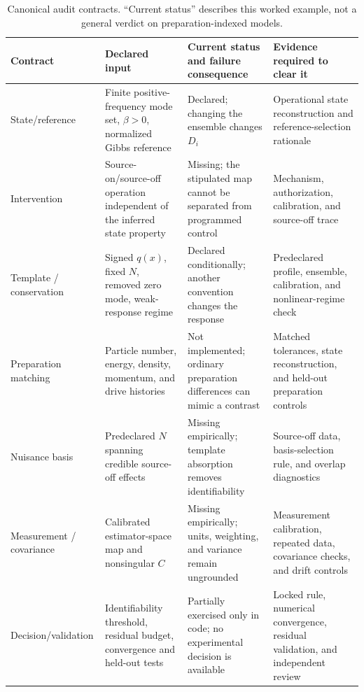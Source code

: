 \documentclass[aps,prd,twocolumn,superscriptaddress,nofootinbib,floatfix]{revtex4-2}
\newcommand{\Drel}{D}
\begin{document}
\begin{table}[t]
\caption{Canonical audit contracts. ``Current status'' describes this worked example, not a general verdict on preparation-indexed models.}
\label{tab:audit-contracts}
\begin{ruledtabular}
\begin{tabular}{p{}p{}p{}p{}}
Contract & Declared input & Current status and failure consequence & Evidence required to clear it \\
\hline
State/reference & Finite positive-frequency mode set, $\beta>0$, normalized Gibbs reference & Declared; changing the ensemble changes $\Drel_i$ & Operational state reconstruction and reference-selection rationale \\
Intervention & Source-on/source-off operation independent of the inferred state property & Missing; the stipulated map cannot be separated from programmed control & Mechanism, authorization, calibration, and source-off trace \\
Template / conservation & Signed $q(x)$, fixed $N$, removed zero mode, weak-response regime & Declared conditionally; another convention changes the response & Predeclared profile, ensemble, calibration, and nonlinear-regime check \\
Preparation matching & Particle number, energy, density, momentum, and drive histories & Not implemented; ordinary preparation differences can mimic a contrast & Matched tolerances, state reconstruction, and held-out preparation controls \\
Nuisance basis & Predeclared $N$ spanning credible source-off effects & Missing empirically; template absorption removes identifiability & Source-off data, basis-selection rule, and overlap diagnostics \\
Measurement / covariance & Calibrated estimator-space map and nonsingular $C$ & Missing empirically; units, weighting, and variance remain ungrounded & Measurement calibration, repeated data, covariance checks, and drift controls \\
Decision/validation & Identifiability threshold, residual budget, convergence and held-out tests & Partially exercised only in code; no experimental decision is available & Locked rule, numerical convergence, residual validation, and independent review \\
\end{tabular}
\end{ruledtabular}
\end{table}
\end{document}
